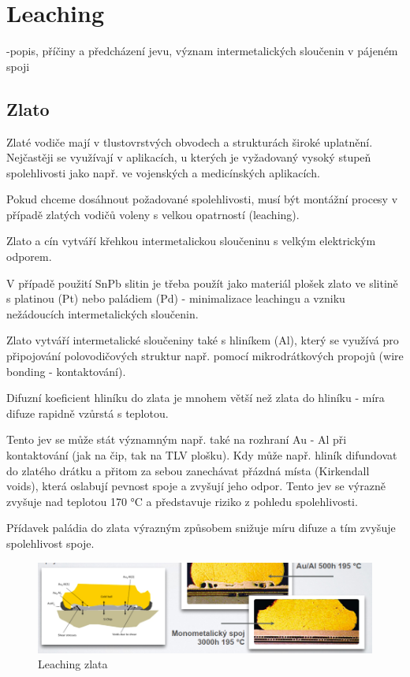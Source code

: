 \section{Leaching}
-popis, příčiny a předcházení jevu, význam intermetalických sloučenin v pájeném spoji

\subsection{Zlato}
Zlaté vodiče mají v tlustovrstvých obvodech a strukturách široké uplatnění. Nejčastěji se využívají v aplikacích, u kterých je vyžadovaný vysoký stupeň spolehlivosti jako např. ve vojenských a medicínských aplikacích.

Pokud chceme dosáhnout požadované spolehlivosti, musí být montážní procesy v případě
zlatých vodičů voleny s velkou opatrností (leaching).

Zlato a cín vytváří křehkou intermetalickou sloučeninu s velkým elektrickým odporem.

V případě použití SnPb slitin je třeba použít jako materiál plošek zlato ve slitině s platinou (Pt) nebo paládiem (Pd) - minimalizace leachingu a vzniku nežádoucích intermetalických
sloučenin.

Zlato vytváří intermetalické sloučeniny také s hliníkem (Al), který se využívá pro připojování polovodičových struktur např. pomocí mikrodrátkových propojů (wire bonding -
kontaktování).

Difuzní koeficient hliníku do zlata je mnohem větší než zlata do hliníku - míra difuze rapidně
vzůrstá s teplotou.

Tento jev se může stát významným např. také na rozhraní Au - Al při kontaktování (jak na
čip, tak na TLV plošku). Kdy může např. hliník difundovat do zlatého drátku a přitom za
sebou zanechávat přázdná místa (Kirkendall voids), která oslabují pevnost spoje a zvyšují jeho odpor. Tento jev se výrazně zvyšuje nad teplotou 170 °C a představuje riziko z pohledu
spolehlivosti.

Přídavek paládia do zlata výrazným způsobem snižuje míru difuze a tím zvyšuje spolehlivost
spoje.

\begin{figure}[h]
   \begin{center}
     \includegraphics[scale=0.6]{images/Leach.png}
   \end{center}
   \caption{Leaching zlata}
\end{figure}


